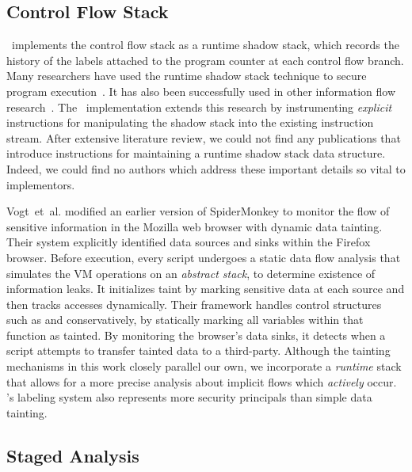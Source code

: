 \subsection{Control Flow Stack}

\JitFlow\ implements the control flow stack as a runtime shadow stack, which records the history of the labels attached to the program counter at each control flow branch.
Many researchers have used the runtime shadow stack technique to secure program execution~\cite{abadi.etal+09, frantzen.shuey+01, prasad.chiueh+03}.
It has also been successfully used in other information flow research~\cite{lam.chiueh+06}.
The \JitFlow\ implementation extends this research by instrumenting \emph{explicit} instructions for manipulating the shadow stack into the existing instruction stream.
After extensive literature review, we could not find any publications that introduce instructions for maintaining a runtime shadow stack data structure.
Indeed, we could find no authors which address these important details so vital to implementors.

Vogt~et~al.\cite{vogt.etal+07} modified an earlier version of SpiderMonkey to monitor the flow of sensitive information in the Mozilla web browser with dynamic data tainting.
Their system explicitly identified data sources and sinks within the Firefox browser.
Before execution, every script undergoes a static data flow analysis that simulates the VM operations on an \emph{abstract stack}, to determine existence of information leaks.
It initializes taint by marking sensitive data at each source and then tracks accesses dynamically.
Their framework handles control structures such as  and  conservatively, by statically marking all variables within that function as tainted.
By monitoring the browser's data sinks, it detects when a script attempts to transfer tainted data to a third-party.
Although the tainting mechanisms in this work closely parallel our own, we incorporate a \emph{runtime} stack that allows for a more precise analysis about implicit flows which \emph{actively} occur.
\JitFlow's labeling system also represents more security principals than simple data tainting.

\subsection{Staged Analysis}

